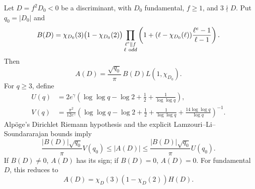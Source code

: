 \begin{theorem}\label{thm:m11-class}
Let \(D=f^2D_0<0\) be a discriminant, with \(D_0\) fundamental,
\(f\ge1\), and \(3\nmid D\). Put \(q_0=|D_0|\) and
\begin{equation}\label{eq:m11-B}
 B(D)=\chi_{D_0}(3)\bigl(1-\chi_{D_0}(2)\bigr)
 \prod_{\substack{\ell^e\parallel f\\\ell\ {\mathrm odd}}}
 \left(1+(\ell-\chi_{D_0}(\ell))
                  \frac{\ell^e-1}{\ell-1}\right).
\end{equation}
Then
\[
 A(D)=\frac{\sqrt{q_0}}{\pi}\,B(D)L(1,\chi_{D_0}).
\]
For \(q\ge3\), define
\begin{align*}
 U(q)&=2e^\gamma
 \left(\log\log q-\log2+\frac12+\frac1{\log\log q}\right),\\
 V(q)&=\frac{\pi^2}{12e^\gamma}
 \left(\log\log q-\log2+\frac12+\frac1{\log\log q}
                  +\frac{14\log\log q}{\log q}\right)^{-1}.
\end{align*}
Alp\"oge's Dirichlet Riemann hypothesis and the explicit
Lamzouri--Li--Soundararajan bounds imply
\begin{equation}\label{eq:m11-bounds}
 \frac{|B(D)|\sqrt{q_0}}{\pi}V(q_0)
 \le |A(D)|\le
 \frac{|B(D)|\sqrt{q_0}}{\pi}U(q_0).
\end{equation}
If \(B(D)\ne0\), \(A(D)\) has its sign; if \(B(D)=0\), \(A(D)=0\).
For fundamental \(D\), this reduces to
\[
 A(D)=\chi_D(3)(1-\chi_D(2))H(D).
\]
\end{theorem}
